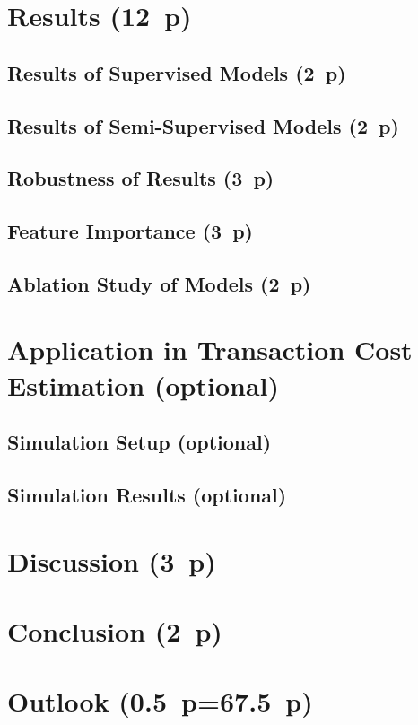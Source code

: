 \newpage
\section{Results (12~p)}\label{sec:results}

\subsection{Results of Supervised
  Models (2~p)}\label{sec:results-of-supervised-models}

\subsection{Results of Semi-Supervised
  Models (2~p)}\label{sec:results-of-semi-supervised-models}

\subsection{Robustness of Results (3~p)}\label{sec:robustness-checks}

\subsection{Feature Importance (3~p)}\label{sec:feature-importance}

\subsection{Ablation Study of Models (2~p)}\label{sec:ablation-study}

\newpage
\section{Application in Transaction Cost Estimation (optional)}\label{sec:application}
\subsection{Simulation Setup (optional)}\label{sec:simulation-setup}
\subsection{Simulation Results (optional)}\label{sec:simulation-results}

\newpage
\section{Discussion (3~p)}\label{sec:discussion}

\newpage
\section{Conclusion (2~p)}\label{sec:conclusion}

\newpage
\section{Outlook (0.5~p=67.5~p)}\label{sec:outlook}

